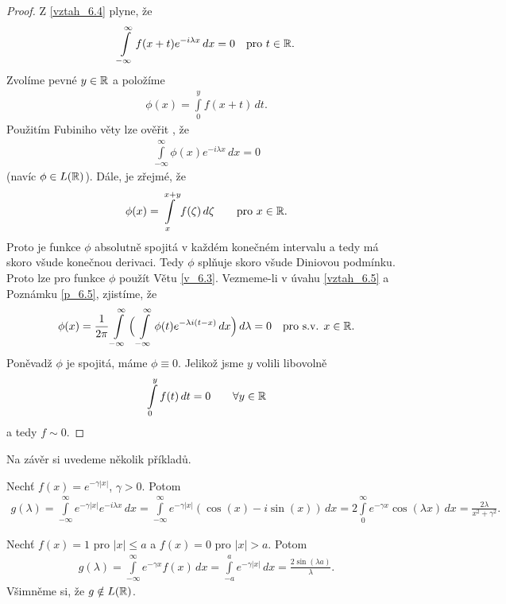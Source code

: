 \begin{proof}
Z \eqref{vztah_6.4} plyne, že
\begin{align*}
\int \limits _{-\infty}^{\infty} f(x+t) e^{-i \lambda x} \, dx = 0 \quad \text{pro $t \in \mathbb{R}$.}
\end{align*}
Zvolíme pevné $y \in \mathbb{R}$ a položíme 
\begin{align*}
\phi(x)=\int \limits _{0}^{y} f(x+t) \, dt.
\end{align*}
Použitím Fubiniho věty lze ověřit , že 
\begin{align}\label{vztah_6.5}
\int \limits _{-\infty}^{\infty} \phi(x) e^{-i \lambda x} \, dx = 0
\end{align}
(navíc $\phi \in L(\mathbb{R})$). Dále, je zřejmé, že 
\begin{align*}
\phi(x)=\int \limits _{x}^{x+y}f(\zeta) \, d \zeta \qquad \text{pro $x \in \mathbb{R}$.}
\end{align*}
Proto je funkce $\phi$ absolutně spojitá v každém konečném intervalu a tedy má skoro všude konečnou derivaci. Tedy $\phi$ splňuje skoro všude Diniovou podmínku. Proto lze pro funkce $\phi$ použít Větu \ref{v_6.3}. Vezmeme-li v úvahu \eqref{vztah_6.5} a Poznámku \ref{p_6.5}, zjistíme, že 
\begin{align*}
\phi(x)=\frac{1}{2\pi} \int \limits _{-\infty}^{\infty} \Big( \int \limits _{-\infty}^{\infty} \phi(t) e^{-\lambda i (t-x)} \, dx \Big) \, d\lambda = 0 \quad \text{pro s.v. $x \in \mathbb{R}$.}
\end{align*}
Poněvadž $\phi$ je spojitá, máme $\phi \equiv 0$. Jelikož jsme $y$ volili libovolně
\begin{align*}
\int \limits _0^y f(t) \, dt = 0 \qquad \text{$\forall y \in \mathbb{R}$}
\end{align*}
a tedy $f \sim 0$.
\end{proof}

Na závěr si uvedeme několik příklad\r u.

\begin{priklad}
Nechť $f(x)=e^{-\gamma|x|}$, $\gamma>0$. Potom
\begin{align*}
g(\lambda)=\int \limits _{-\infty}^{\infty} e^{-\gamma|x|} e^{-i \lambda x} \, dx = \int \limits _{-\infty}^{\infty} e^{-\gamma|x|} (\cos(x)-i \sin(x)) \, dx = 2 \int \limits _0^{\infty}e^{-\gamma x} \cos(\lambda x) \, dx = \frac{2 \lambda}{x^2+\gamma ^2}.
\end{align*}
\end{priklad}

\begin{priklad}
Nechť $f(x)=1$ pro $|x|\leq a$ a $f(x)=0$ pro $|x|>a.$ Potom 
\begin{align*}
g(\lambda)=\int \limits _{-\infty}^{\infty} e^{-\gamma x} f(x) \, dx = \int \limits _{-a}^{a} e^{-\gamma|x|} \, dx = \frac{2 \sin(\lambda a) }{\lambda}.
\end{align*}
Všimněme si, že $g \notin L(\mathbb{R})$.
\end{priklad}

